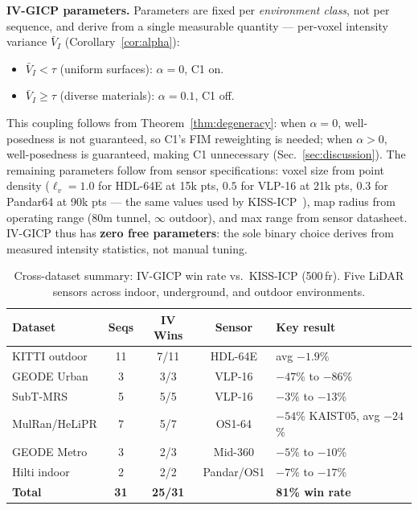 \documentclass[journal,letterpaper,10pt]{IEEEtran}
\begin{document}
\textbf{IV-GICP parameters.}
Parameters are fixed per \textit{environment class}, not per sequence,
and derive from a single measurable quantity --- per-voxel
intensity variance $\bar{V}_I$ (Corollary~\ref{cor:alpha}):
\begin{itemize}
  \item $\bar{V}_I < \tau$ (uniform surfaces): $\alpha{=}0$, C1 on.
  \item $\bar{V}_I \geq \tau$ (diverse materials): $\alpha{=}0.1$, C1 off.
\end{itemize}
This coupling follows from Theorem~\ref{thm:degeneracy}:
when $\alpha{=}0$, well-posedness is not guaranteed, so C1's FIM
reweighting is needed; when $\alpha{>}0$, well-posedness is guaranteed,
making C1 unnecessary (Sec.~\ref{sec:discussion}).
The remaining parameters follow from sensor specifications:
voxel size from point density ($\ell_v{=}1.0$ for HDL-64E at 15k pts,
$0.5$ for VLP-16 at 21k pts, $0.3$ for Pandar64 at 90k pts ---
the same values used by KISS-ICP~\cite{vizzo2023kiss}),
map radius from operating range (80m tunnel, $\infty$ outdoor),
and max range from sensor datasheet.
IV-GICP thus has \textbf{zero free parameters}: the sole binary
choice derives from measured intensity statistics, not manual tuning.

\begin{table}[t]
\centering
\caption{Cross-dataset summary: IV-GICP win rate vs.\ KISS-ICP (500\,fr).
  Five LiDAR sensors across indoor, underground, and outdoor environments.}
\label{tab:summary}
\begin{tabular}{lcccl}
\toprule
Dataset & Seqs & IV Wins & Sensor & Key result \\
\midrule
KITTI outdoor    & 11 & 7/11 & HDL-64E & avg $-1.9\%$ \\
GEODE Urban      &  3 & 3/3  & VLP-16  & $-47$\% to $-86$\% \\
SubT-MRS         &  5 & 5/5  & VLP-16  & $-3$\% to $-13$\% \\
MulRan/HeLiPR    &  7 & 5/7  & OS1-64  & $-54$\% KAIST05, avg $-24$\% \\
GEODE Metro      &  3 & 2/3  & Mid-360 & $-5$\% to $-10$\% \\
Hilti indoor     &  2 & 2/2  & Pandar/OS1 & $-7$\% to $-17$\% \\
\midrule
\textbf{Total}   & \textbf{31} & \textbf{25/31} &  & \textbf{81\% win rate} \\
\bottomrule
\end{tabular}
\end{table}
\end{document}
